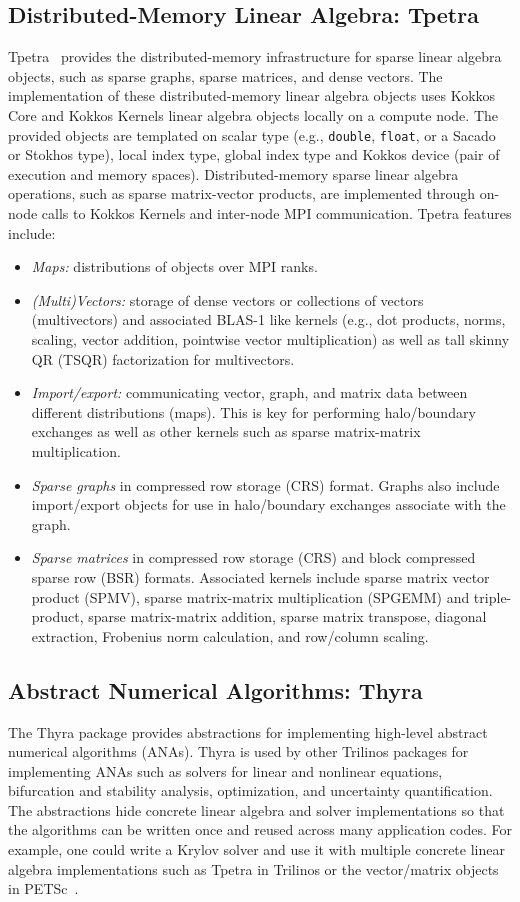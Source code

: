 \subsection{Distributed-Memory Linear Algebra: Tpetra}\label{subsec:tpetra}
Tpetra~\cite{Baker2012,hoemmen2015tpetra} provides the distributed-memory
infrastructure for sparse linear algebra objects, such as sparse graphs,
sparse matrices, and dense vectors.  The implementation of these
distributed-memory linear algebra objects uses Kokkos Core and Kokkos Kernels linear algebra objects locally on a compute node.
The provided objects are templated on scalar type (e.g., \texttt{double}, \texttt{float}, or a Sacado or Stokhos type), local index type, global index type and Kokkos device (pair of execution and memory spaces).
Distributed-memory sparse linear algebra operations, such as
sparse matrix-vector products, are implemented through on-node calls
to Kokkos Kernels and inter-node MPI communication. Tpetra features
include:
\begin{itemize}
\item \emph{Maps:} distributions of objects over MPI ranks.
\item \emph{(Multi)Vectors:} storage of dense vectors or collections of
vectors (multivectors) and associated BLAS-1 like kernels (e.g., dot
products, norms, scaling, vector addition, pointwise vector
multiplication) as well as tall skinny QR (TSQR) factorization for multivectors.
\item \emph{Import/export:} communicating vector, graph, and matrix data
between different distributions (maps). This is key for performing
halo/boundary exchanges as well as other kernels such as
sparse matrix-matrix multiplication.
\item \emph{Sparse graphs} in compressed row storage (CRS)
format. Graphs also include import/export objects for use in
halo/boundary exchanges associate with the graph.
\item \emph{Sparse matrices} in compressed row storage (CRS) and
block compressed sparse row (BSR) formats.  Associated kernels include
sparse matrix vector product (SPMV), sparse matrix-matrix
multiplication (SPGEMM) and triple-product, sparse matrix-matrix addition, sparse matrix transpose, diagonal extraction,
Frobenius norm calculation, and row/column scaling.
\end{itemize}

\subsection{Abstract Numerical Algorithms: Thyra}
The Thyra package provides abstractions for implementing high-level abstract numerical algorithms (ANAs). Thyra is used by other Trilinos packages for implementing ANAs such as solvers for linear and nonlinear equations, bifurcation and stability analysis, optimization, and uncertainty quantification. The abstractions hide concrete linear algebra and solver implementations so that the algorithms can be written once and reused across many application codes. For example, one could write a Krylov solver and use it with multiple concrete linear algebra implementations such as Tpetra in Trilinos %
or the vector/matrix objects in PETSc~\cite{petsc-web-page}.

